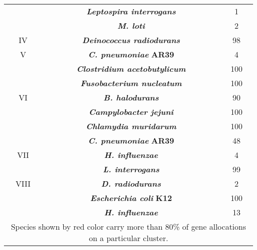 \begin{center}
\begin{tabular}{|c|c|c|}
&\color[cmyk]{0,0,0,1}\textit{\textbf{Leptospira interrogans}}&\color[cmyk]{0,0,0,1}1\\
&\color[cmyk]{0,0,0,1}\textit{\textbf{M. loti}}&\color[cmyk]{0,0,0,1}2\\
\hline
IV&\color[cmyk]{0,0.7,0.7,0}\textit{\textbf{Deinococcus radiodurans}}&\color[cmyk]{0,0.7,0.7,0}98\\
\hline
V&\color[cmyk]{0,0,0,1}\textit{\textbf{C. pneumoniae}} \textbf{AR39}&\color[cmyk]{0,0,0,1}4\\
&\color[cmyk]{0,1,1,0}\textit{\textbf{Clostridium acetobutylicum}}&\color[cmyk]{0,1,1,0}100\\
&\color[cmyk]{0,1,1,0}\textit{\textbf{Fusobacterium nucleatum}}&\color[cmyk]{0,1,1,0}100\\
\hline
VI&\color[cmyk]{0,0.7,0.7,0}\textit{\textbf{B. halodurans}}&\color[cmyk]{0,0.7,0.7,0}90\\
&\color[cmyk]{0,1,1,0}\textit{\textbf{Campylobacter jejuni}}&\color[cmyk]{0,1,1,0}100\\
&\color[cmyk]{0,1,1,0}\textit{\textbf{Chlamydia muridarum}}&\color[cmyk]{0,1,1,0}100\\
&\color[cmyk]{0,0,0,1}\textit{\textbf{C. pneumoniae}} \textbf{AR39}&\color[cmyk]{0,0,0,1}48\\
\hline
VII&\color[cmyk]{0,0,0,1}\textit{\textbf{H. influenzae}}&\color[cmyk]{0,0,0,1}4\\
&\color[cmyk]{0,0.7,0.7,0}\textit{\textbf{L. interrogans}}&\color[cmyk]{0,0.7,0.7,0}99\\
\hline
VIII&\color[cmyk]{0,0,0,1}\textit{\textbf{D. radiodurans}}&\color[cmyk]{0,0,0,1}2\\
&\color[cmyk]{0,1,1,0}\textit{\textbf{Escherichia coli}} \textbf{K12}&\color[cmyk]{0,1,1,0}100\\
&\color[cmyk]{0,0,0,1}\textit{\textbf{H. influenzae}}&\color[cmyk]{0,0,0,1}13\\
\hline
\multicolumn{3}{p{240mm}}{\linespread{0.9}\fontsize{22}{20}\selectfont \color[cmyk]{0,0,0,1}Species shown by \color[cmyk]{0,0.7,0.7,0}red \color[cmyk]{0,0,0,1}color carry more than 80\% of gene allocations on a particular cluster.}\\[-8mm]
\end{tabular}
\end{center}
